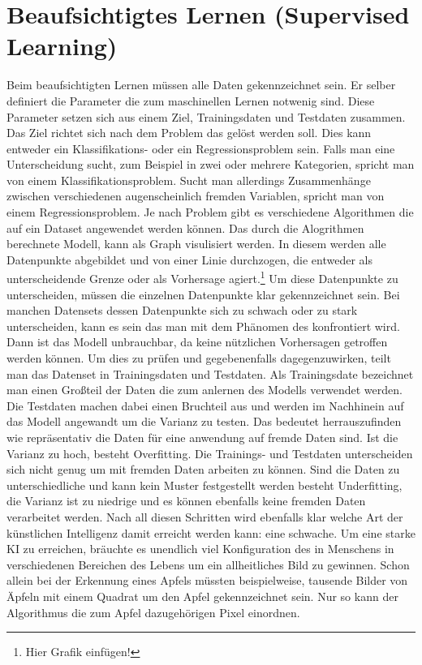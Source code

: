 \documentclass[a4paper,12pt,german,ngerman]{report}
\begin{document}
    \section{Beaufsichtigtes Lernen (Supervised Learning) }
        Beim beaufsichtigten Lernen müssen alle Daten gekennzeichnet sein.
        Er selber definiert die Parameter die zum maschinellen Lernen notwenig sind.
        Diese Parameter setzen sich aus einem Ziel, Trainingsdaten und Testdaten zusammen.
        Das Ziel richtet sich nach dem Problem das gelöst werden soll. Dies kann entweder ein
        Klassifikations- oder ein Regressionsproblem sein.\cite{kibuisness2021supervised}
        Falls man eine Unterscheidung sucht, zum Beispiel in zwei oder mehrere Kategorien, spricht
        man von einem Klassifikationsproblem. Sucht man allerdings Zusammenhänge zwischen verschiedenen
        augenscheinlich fremden Variablen, spricht man von einem Regressionsproblem. Je nach Problem gibt
        es verschiedene Algorithmen die auf ein Dataset angewendet werden können. Das durch die Alogrithmen
        berechnete Modell, kann als Graph visulisiert werden. In diesem werden alle Datenpunkte abgebildet und von
        einer Linie durchzogen, die entweder als unterscheidende Grenze oder als Vorhersage agiert.\footnote{Hier Grafik einfügen!}
        Um diese Datenpunkte zu unterscheiden, müssen die einzelnen Datenpunkte klar gekennzeichnet sein.
        Bei manchen Datensets dessen Datenpunkte sich zu schwach oder zu stark unterscheiden, kann es sein das man mit dem Phänomen des
         konfrontiert wird. Dann ist das Modell unbrauchbar, da keine nützlichen Vorhersagen getroffen werden können.
        Um dies zu prüfen und gegebenenfalls dagegenzuwirken, teilt man das Datenset in Trainingsdaten und Testdaten.
        Als Trainingsdate bezeichnet man einen Großteil der Daten die zum anlernen des Modells verwendet werden. Die Testdaten
        machen dabei einen Bruchteil aus und werden im Nachhinein auf das Modell angewandt um die Varianz zu testen.
        Das bedeutet herrauszufinden wie repräsentativ die Daten für eine anwendung auf fremde Daten sind.
        Ist die Varianz zu hoch, besteht Overfitting. Die Trainings- und Testdaten unterscheiden sich nicht genug um
        mit fremden Daten arbeiten zu können. Sind die Daten zu unterschiedliche und kann kein Muster festgestellt werden
        besteht Underfitting, die Varianz ist zu niedrige und es können ebenfalls keine fremden Daten verarbeitet werden.
        Nach all diesen Schritten wird ebenfalls klar welche Art der künstlichen Intelligenz damit erreicht werden kann:
        eine schwache. Um eine starke KI zu erreichen, bräuchte es unendlich viel Konfiguration des in Menschens in verschiedenen
        Bereichen des Lebens um ein allheitliches Bild zu gewinnen. Schon allein bei der Erkennung eines
        Apfels müssten beispielweise, tausende Bilder von Äpfeln mit einem Quadrat um den Apfel gekennzeichnet sein. Nur so
        kann der Algorithmus die zum Apfel dazugehörigen Pixel einordnen.
\end{document}
